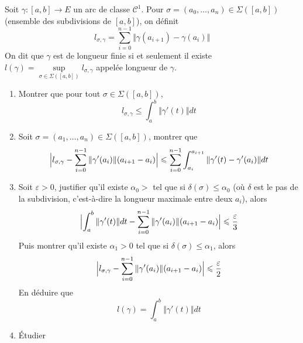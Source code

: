 \begin{exercise}
	Soit $\gamma\colon[a,b]\to E$ un arc de classe $\mathcal{C}^{1}$. Pour $\sigma=(a_{0},\dots,a_{n})\in\Sigma([a,b])$ (ensemble des subdivisions de $[a,b]$), on définit 
	$$l_{\sigma,\gamma}=\sum_{i=0}^{n-1}\Vert \gamma(a_{i+1})-\gamma(a_{i})\Vert$$
	On dit que $\gamma$ est de longueur finie si et seulement il existe $l(\gamma)=\sup\limits_{\sigma\in\Sigma([a,b])}l_{\sigma,\gamma}$ appelée longueur de $\gamma$.

	\begin{enumerate}
		\item Montrer que pour tout $\sigma\in\Sigma([a,b])$, 
		$$l_{\sigma,\gamma}\leqslant\int_{a}^{b}\Vert\gamma'(t)\Vert dt$$
		
		\item Soit $\sigma=(a_{1},\dots,a_{n})\in\Sigma([a,b])$, montrer que 
		$$\Bigl\vert l_{\sigma,\gamma}-\sum_{i=0}^{n-1}\Vert\gamma'(a_{i})\Vert (a_{i+1}-a_{i})\Bigr\vert\leqslant\sum_{i=0}^{n-1}\int_{a_{i}}^{a_{i+1}}\Vert\gamma'(t)-\gamma'(a_{i})\Vert dt$$
		
		\item Soit $\varepsilon>0$, justifier qu'il existe $\alpha_{0}>$ tel que si $\delta(\sigma)\leqslant\alpha_{0}$ (où $\delta$ est le pas de la subdivision, c'est-à-dire la longueur maximale entre deux $a_{i}$), alors 
		$$\Bigl\vert\int_{a}^{b}\Vert \gamma'(t)\Vert dt-\sum_{i=0}^{n-1}\Vert\gamma'(a_{i})\Vert(a_{i+1}-a_{i})\Bigr\vert\leqslant\frac{\varepsilon}{3}$$
		Puis montrer qu'il existe $\alpha_{1}>0$ tel que si $\delta(\sigma)\leqslant\alpha_{1}$, alors 
		$$\Bigl\vert l_{\sigma,\gamma}-\sum_{i=0}^{n-1}\Vert\gamma'(a_{i})\Vert(a_{i+1}-a_{i})\Bigr\vert\leqslant\frac{\varepsilon}{2}$$
		En déduire que 
		$$l(\gamma)=\int_{a}^{b}\Vert\gamma'(t)\Vert dt$$
		
		\item Étudier 
	\end{enumerate}
\end{exercise}

